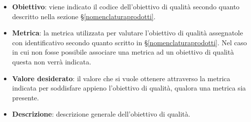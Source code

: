 \begin{itemize}
	\item \textbf{Obiettivo}: viene indicato il codice dell'obiettivo di qualità secondo quanto descritto nella sezione \S\ref{nomenclaturaprodotti}.
	\item \textbf{Metrica}: la metrica utilizzata per valutare l'obiettivo di qualità assegnatole con identificativo secondo quanto scritto in \S\ref{nomenclaturaprodotti}. Nel caso in cui non fosse possibile associare una metrica ad un obiettivo di qualità questa non verrà indicata.
	\item \textbf{Valore desiderato}: il valore che si vuole ottenere attraverso la metrica indicata per soddisfare appieno l'obiettivo di qualità, qualora una metrica sia presente.
	\item \textbf{Descrizione}: descrizione generale dell'obiettivo di qualità.
\end{itemize}



